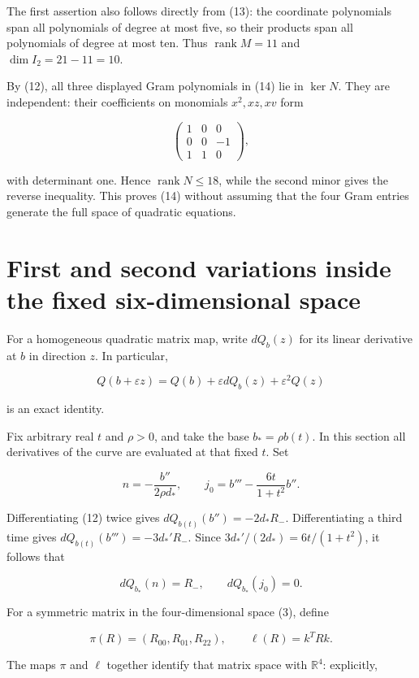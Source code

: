 \documentclass[11pt]{article}
\begin{document}
The first assertion also follows directly from (13): the coordinate
polynomials span all polynomials of degree at most five, so their products
span all polynomials of degree at most ten. Thus \(\operatorname{rank}M=11\)
and \(\dim I_2=21-11=10\).

By (12), all three displayed Gram polynomials in (14) lie in \(\ker N\).
They are independent: their coefficients on monomials \(x^2,xz,xv\) form

\[
\begin{pmatrix}1&0&0\\0&0&-1\\1&1&0\end{pmatrix},
\]

with determinant one. Hence \(\operatorname{rank}N\le18\), while the second
minor gives the reverse inequality. This proves (14) without assuming that
the four Gram entries generate the full space of quadratic equations.

\section{First and second variations inside the fixed six-dimensional space}

For a homogeneous quadratic matrix map, write \(dQ_b(z)\) for its linear
derivative at \(b\) in direction \(z\). In particular,

\[
Q(b+\varepsilon z)
 =Q(b)+\varepsilon dQ_b(z)+\varepsilon^2Q(z)
\tag{15}
\]

is an exact identity.

Fix arbitrary real \(t\) and \(\rho>0\), and take the base
\(b_*=\rho b(t)\). In this section all derivatives of the curve are
evaluated at that fixed \(t\). Set

\[
n=-\frac{b''}{2\rho d_*},\qquad
j_0=b'''-\frac{6t}{1+t^2}b''.
\tag{16}
\]

Differentiating (12) twice gives
\(dQ_{b(t)}(b'')=-2d_*R_-\). Differentiating a third time gives
\(dQ_{b(t)}(b''')=-3d_*'R_-\). Since
\(3d_*'/(2d_*)=6t/(1+t^2)\), it follows that

\[
dQ_{b_*}(n)=R_-,\qquad dQ_{b_*}(j_0)=0.
\tag{17}
\]

For a symmetric matrix in the four-dimensional space (3), define

\[
\pi(R)=(R_{00},R_{01},R_{22}),\qquad
\ell(R)=k^TRk.
\tag{18}
\]

The maps \(\pi\) and \(\ell\) together identify that matrix space with
\(\mathbb R^4\): explicitly,
\end{document}
